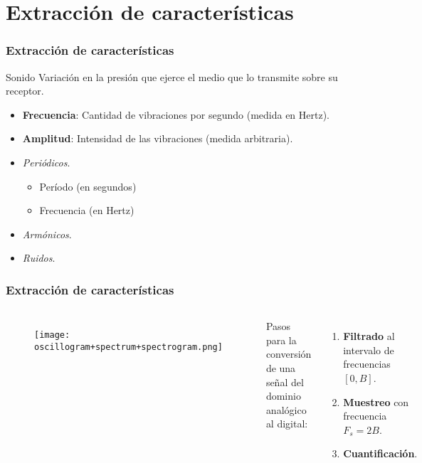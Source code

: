 \section{Extracción de características}\label{sec:features}

\begin{frame}
    \frametitle{Extracción de características}

    \begin{block}{Sonido}
        Variación en la presión que ejerce el medio que lo transmite sobre su receptor.
        \begin{itemize}
            \item<2-> \textbf{Frecuencia}: Cantidad de vibraciones por segundo (medida en Hertz).
            \item<3-> \textbf{Amplitud}: Intensidad de las vibraciones (medida arbitraria).
        \end{itemize}
    \end{block}

    \begin{itemize}
        \item<4-> \textit{Periódicos}.
        \begin{itemize}
            \item Período (en segundos)
            \item Frecuencia (en Hertz)
        \end{itemize}
        \item<5-> \textit{Armónicos}.
        \item<6-> \textit{Ruidos}.
    \end{itemize}
\end{frame}

\begin{frame}
    \frametitle{Extracción de características}

    \begin{columns}

        \begin{figure}[!h]
            \centering
            \texttt{[image: oscillogram+spectrum+spectrogram.png]}
        \end{figure}

        \pause

        Pasos para la conversión de una señal del dominio analógico al digital:
        \begin{enumerate}
            \item<3-> \textbf{Filtrado} al intervalo de frecuencias $[0,B]$.
            \item<4-> \textbf{Muestreo} con frecuencia $F_s = 2B$.
            \item<5-> \textbf{Cuantificación}.
        \end{enumerate}

    \end{columns}
\end{frame}

